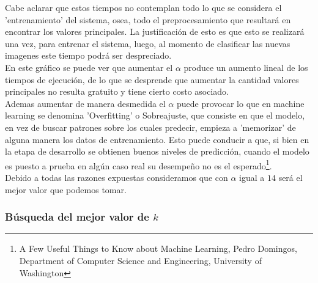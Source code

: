 Cabe aclarar que estos tiempos no contemplan todo lo que se considera el 'entrenamiento' del sistema, osea, todo el preprocesamiento que resultará en encontrar los valores principales. La justificación de esto es que esto se realizará una vez, para entrenar el sistema, luego, al momento de clasificar las nuevas imagenes este tiempo podrá ser despreciado.
\\
En este gráfico se puede ver que aumentar el $\alpha$ produce un aumento lineal de los tiempos de ejecución, de lo que se desprende que aumentar la cantidad valores principales no resulta gratuito y tiene cierto costo asociado.
\\
Ademas aumentar de manera desmedida el $\alpha$ puede provocar lo que en machine learning se denomina 'Overfitting' o Sobreajuste, que consiste en que el modelo, en vez de buscar patrones sobre los cuales predecir, empieza a 'memorizar' de alguna manera los datos de entrenamiento. Esto puede conducir a que, si bien en la etapa de desarrollo se obtienen buenos niveles de predicción, cuando el modelo es puesto a prueba en algún caso real su desempeño no es el esperado\footnote{\label{note1}A Few Useful Things to Know about Machine Learning, Pedro Domingos, Department of Computer Science and Engineering, University of Washington}.
\\
Debido a todas las razones expuestas consideramos que con $\alpha$ igual a $14$ será el mejor valor que podemos tomar.
\\
\subsubsection{Búsqueda del mejor valor de $k$}

